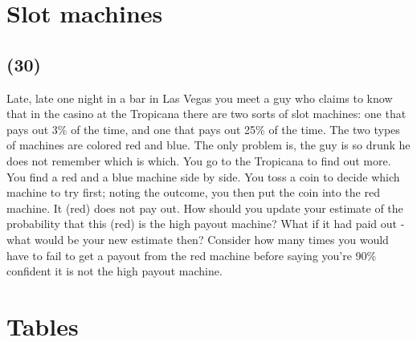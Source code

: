 \documentclass[11pt,a4paper]{article}
\makeatletter
\renewcommand\listoftables{%
    \@starttoc{lot}%
}
\makeatother
\begin{document}
\newpage

\section{Slot machines}
\subsection*{(30)}
Late, late one night in a bar in Las Vegas you meet a guy who claims to know that in the casino at the Tropicana there are two sorts of slot machines: one that pays out 3\% of the time, and one that pays out 25\% of the time. The two types of machines are colored red and blue. The only problem is, the guy is so drunk he does not remember which is which. You go to the Tropicana to find out more. You find a red and a blue machine side by side. You toss a coin to decide which machine to try first; noting the outcome, you then put the coin into the red machine. It (red) does not pay out. How should you update your estimate of the probability that this (red) is the high payout machine? What if it had paid out - what would be your new estimate then? Consider how many times you would have to fail to get a payout from the red machine before saying you're 90\% confident it is not the high payout machine.





\newpage

\section*{Tables}

{%
\let\oldnumberline\numberline%
\renewcommand{\numberline}{\tablename~\oldnumberline}%
\listoftables%
}

\newpage


\end{document}
